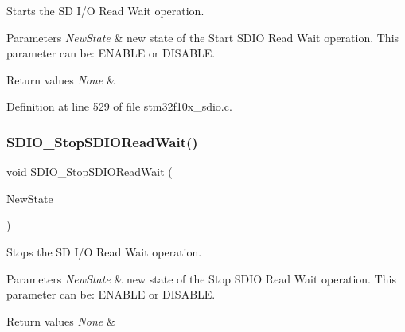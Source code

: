Starts the SD I/O Read Wait operation. 


\begin{DoxyParams}{Parameters}
{\em New\+State} & new state of the Start S\+D\+IO Read Wait operation. This parameter can be\+: E\+N\+A\+B\+LE or D\+I\+S\+A\+B\+LE. \\
\hline
\end{DoxyParams}

\begin{DoxyRetVals}{Return values}
{\em None} & \\
\hline
\end{DoxyRetVals}


Definition at line 529 of file stm32f10x\+\_\+sdio.\+c.

\mbox{\label{group___s_d_i_o___exported___functions_gaca6b25eb2debb73ac827c66f0ebcf837}} 
\subsubsection{\texorpdfstring{S\+D\+I\+O\+\_\+\+Stop\+S\+D\+I\+O\+Read\+Wait()}{SDIO\_StopSDIOReadWait()}}
{\footnotesize\ttfamily void S\+D\+I\+O\+\_\+\+Stop\+S\+D\+I\+O\+Read\+Wait (\begin{DoxyParamCaption}\item[{\hyperlink{group___exported__types_gac9a7e9a35d2513ec15c3b537aaa4fba1}{Functional\+State}}]{New\+State }\end{DoxyParamCaption})}



Stops the SD I/O Read Wait operation. 


\begin{DoxyParams}{Parameters}
{\em New\+State} & new state of the Stop S\+D\+IO Read Wait operation. This parameter can be\+: E\+N\+A\+B\+LE or D\+I\+S\+A\+B\+LE. \\
\hline
\end{DoxyParams}

\begin{DoxyRetVals}{Return values}
{\em None} & \\
\hline
\end{DoxyRetVals}


